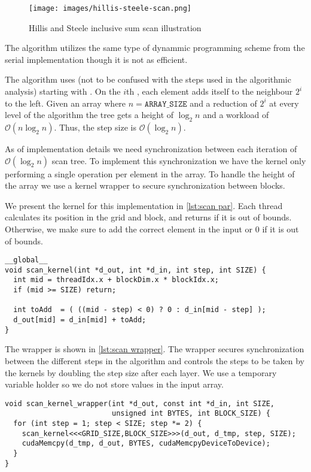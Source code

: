 \begin{figure}[htb]
  \centering
  \texttt{[image: images/hillis-steele-scan.png]}
  \caption{Hillis and Steele inclusive sum scan illustration}
  \label{fig:hillis steele scan}
\end{figure}

The algorithm utilizes the same type of dynammic programming scheme from the serial implementation though it is not as efficient.

The algorithm uses  (not to be confused with the steps used in the algorithmic analysis) starting with .
On the $i$th , each element adds itself to the neighbour $2^i$ to the left.
Given an array where $n=\mathtt{ARRAY\_SIZE}$ and a reduction of $2^i$ at every level of the algorithm the tree gets a height of $\log_2 n$ and a workload of $\mathcal{O}(n \log_2 n)$.
Thus, the step size is $\mathcal{O}(\log_2 n)$.

As of implementation details we need synchronization between each iteration of $\mathcal{O}(\log_2 n)$ scan tree.
To implement this synchronization we have the kernel only performing a single operation per element in the array.
To handle the height of the array we use a kernel wrapper to secure synchronization between blocks.

We present the kernel for this implementation in \cref{lst:scan par}.
Each thread calculates its position in the grid and block, and returns if it is out of bounds.
Otherwise, we make sure to add the correct element in the input or 0 if it is out of bounds.

\begin{lstlisting}[caption={Hillis and Steele scan kernel}, label={lst:scan par}]
__global__
void scan_kernel(int *d_out, int *d_in, int step, int SIZE) {
  int mid = threadIdx.x + blockDim.x * blockIdx.x;
  if (mid >= SIZE) return;

  int toAdd  = ( ((mid - step) < 0) ? 0 : d_in[mid - step] );
  d_out[mid] = d_in[mid] + toAdd;
}
\end{lstlisting}

The wrapper is shown in \cref{lst:scan wrapper}.
The wrapper secures synchronization between the different steps in the algorithm and controls the steps to be taken by the kernels by doubling the step size after each layer.
We use a temporary variable holder so we do not store values in the input array.

\begin{lstlisting}[caption={Hillis and Steele scan kernel wrapper}, label={lst:scan wrapper}]
void scan_kernel_wrapper(int *d_out, const int *d_in, int SIZE, 
                         unsigned int BYTES, int BLOCK_SIZE) {
  for (int step = 1; step < SIZE; step *= 2) {
    scan_kernel<<<GRID_SIZE,BLOCK_SIZE>>>(d_out, d_tmp, step, SIZE);
    cudaMemcpy(d_tmp, d_out, BYTES, cudaMemcpyDeviceToDevice);
  }
}
\end{lstlisting}

